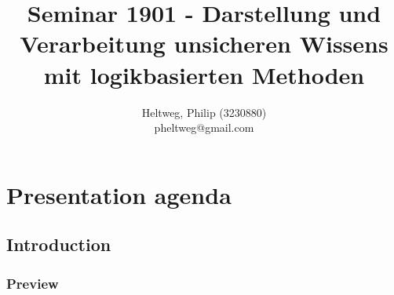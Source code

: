 \documentclass[11pt]{article}
\begin{document}
\title{Seminar 1901 - Darstellung und Verarbeitung unsicheren Wissens mit logikbasierten Methoden}
\author{
	Heltweg, Philip (3230880) \\
	pheltweg@gmail.com
}
\maketitle

\newpage

\tableofcontents

\newpage

\section{Presentation agenda}
\subsection{Introduction}
\subsubsection{Preview}
\end{document}
